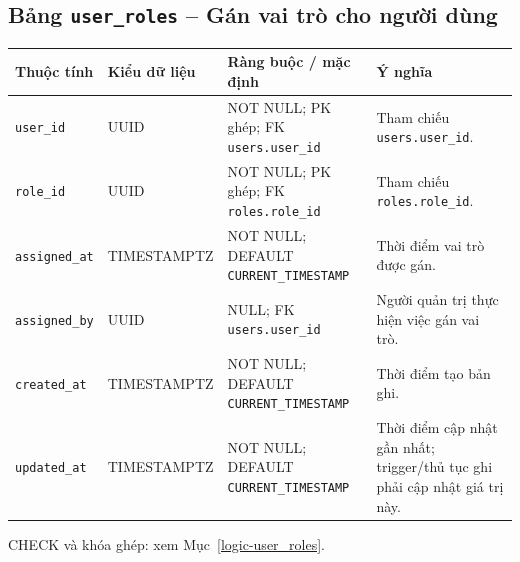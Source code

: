 \subsection{Bảng \texttt{user\_\allowbreak{}roles} -- Gán vai trò cho người dùng}
\label{dictionary-user_roles}
\begingroup
\footnotesize
\setlength{\tabcolsep}{3pt}
\begin{longtable}{>{\raggedright\arraybackslash}p{3.1cm}>{\raggedright\arraybackslash}p{2.5cm}>{\raggedright\arraybackslash}p{3.7cm}>{\raggedright\arraybackslash}p{4.3cm}}
\toprule
Thuộc tính & Kiểu dữ liệu & Ràng buộc / mặc định & Ý nghĩa \\
\midrule
\endhead
\texttt{user\_\allowbreak{}id} & UUID & NOT NULL; PK ghép; FK \texttt{users.user\_\allowbreak{}id} & Tham chiếu \texttt{users.user\_\allowbreak{}id}. \\
\texttt{role\_\allowbreak{}id} & UUID & NOT NULL; PK ghép; FK \texttt{roles.role\_\allowbreak{}id} & Tham chiếu \texttt{roles.role\_\allowbreak{}id}. \\
\texttt{assigned\_\allowbreak{}at} & TIMESTAMPTZ & NOT NULL; DEFAULT \texttt{CURRENT\_\allowbreak{}TIMESTAMP} & Thời điểm vai trò được gán. \\
\texttt{assigned\_\allowbreak{}by} & UUID & NULL; FK \texttt{users.user\_\allowbreak{}id} & Người quản trị thực hiện việc gán vai trò. \\
\texttt{created\_\allowbreak{}at} & TIMESTAMPTZ & NOT NULL; DEFAULT \texttt{CURRENT\_\allowbreak{}TIMESTAMP} & Thời điểm tạo bản ghi. \\
\texttt{updated\_\allowbreak{}at} & TIMESTAMPTZ & NOT NULL; DEFAULT \texttt{CURRENT\_\allowbreak{}TIMESTAMP} & Thời điểm cập nhật gần nhất; trigger/thủ tục ghi phải cập nhật giá trị này. \\
\bottomrule
\end{longtable}
\endgroup
CHECK và khóa ghép: xem Mục~\ref{logic-user_roles}.
